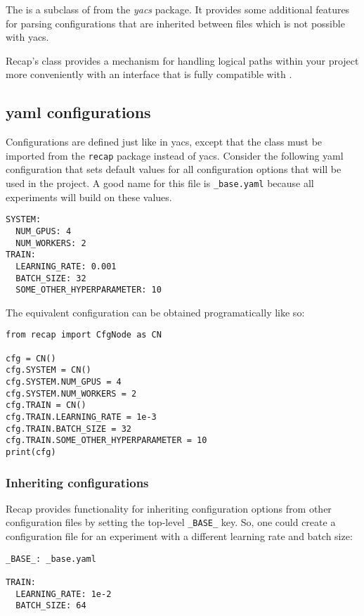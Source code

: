 \documentclass[../../report.tex]{subfiles}
\begin{document}
The  is a subclass of  from the \emph{yacs} package.
It provides some additional features for parsing configurations that are inherited between files which is not possible with yacs.

Recap's  class provides a mechanism for handling logical paths within your project more conveniently with an interface that is fully compatible with .

\subsection{\Acs{yaml} configurations}
Configurations are defined just like in yacs, except that the  class must be imported from the \texttt{recap} package instead of yacs.
Consider the following \gls{yaml} configuration that sets default values for all configuration options that will be used in the project.
A good name for this file is \texttt{\_base.yaml} because all experiments will build on these values.
\begin{verbatim}
SYSTEM:
  NUM_GPUS: 4
  NUM_WORKERS: 2
TRAIN:
  LEARNING_RATE: 0.001
  BATCH_SIZE: 32
  SOME_OTHER_HYPERPARAMETER: 10
\end{verbatim}

The equivalent configuration can be obtained programatically like so:

\begin{verbatim}
from recap import CfgNode as CN

cfg = CN()
cfg.SYSTEM = CN()
cfg.SYSTEM.NUM_GPUS = 4
cfg.SYSTEM.NUM_WORKERS = 2
cfg.TRAIN = CN()
cfg.TRAIN.LEARNING_RATE = 1e-3
cfg.TRAIN.BATCH_SIZE = 32
cfg.TRAIN.SOME_OTHER_HYPERPARAMETER = 10
print(cfg)
\end{verbatim}

\subsubsection{Inheriting configurations}
Recap provides functionality for inheriting configuration options from other configuration files by setting the top-level \texttt{_BASE_} key.
So, one could create a configuration file  for an experiment with a different learning rate and batch size:

\begin{verbatim}
_BASE_: _base.yaml

TRAIN:
  LEARNING_RATE: 1e-2
  BATCH_SIZE: 64
\end{verbatim}
\end{document}
